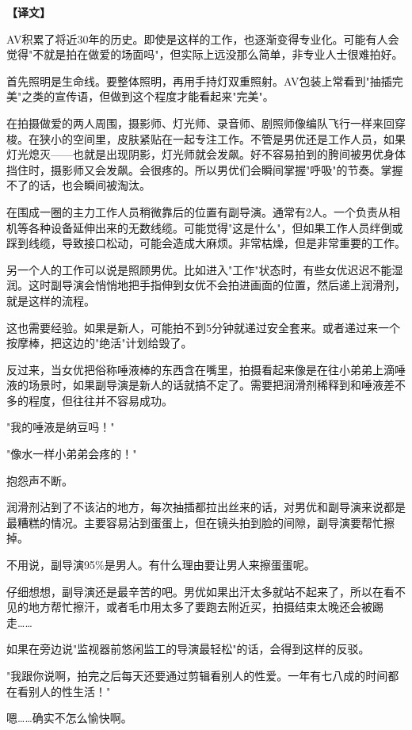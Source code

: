 \documentclass[12pt,UTF8]{ctexbook}
\begin{document}
{\vspace{2ex}
\parbox{0.9\linewidth}{
\textbf{【译文】}\par

AV积累了将近30年的历史。即使是这样的工作，也逐渐变得专业化。可能有人会觉得"不就是拍在做爱的场面吗"，但实际上远没那么简单，非专业人士很难拍好。

首先照明是生命线。要整体照明，再用手持灯双重照射。AV包装上常看到"抽插完美"之类的宣传语，但做到这个程度才能看起来"完美"。

在拍摄做爱的两人周围，摄影师、灯光师、录音师、剧照师像编队飞行一样来回穿梭。在狭小的空间里，皮肤紧贴在一起专注工作。不管是男优还是工作人员，如果灯光熄灭——也就是出现阴影，灯光师就会发飙。好不容易拍到的胯间被男优身体挡住时，摄影师又会发飙。会很疼的。所以男优们会瞬间掌握"呼吸"的节奏。掌握不了的话，也会瞬间被淘汰。

在围成一圈的主力工作人员稍微靠后的位置有副导演。通常有2人。一个负责从相机等各种设备延伸出来的无数线缆。可能觉得"这是什么"，但如果工作人员绊倒或踩到线缆，导致接口松动，可能会造成大麻烦。非常枯燥，但是非常重要的工作。

另一个人的工作可以说是照顾男优。比如进入"工作"状态时，有些女优迟迟不能湿润。这时副导演会悄悄地把手指伸到女优不会拍进画面的位置，然后递上润滑剂，就是这样的流程。

这也需要经验。如果是新人，可能拍不到5分钟就递过安全套来。或者递过来一个按摩棒，把这边的"绝活"计划给毁了。

反过来，当女优把俗称唾液棒的东西含在嘴里，拍摄看起来像是在往小弟弟上滴唾液的场景时，如果副导演是新人的话就搞不定了。需要把润滑剂稀释到和唾液差不多的程度，但往往并不容易成功。

"我的唾液是纳豆吗！"

"像水一样小弟弟会疼的！"

抱怨声不断。

润滑剂沾到了不该沾的地方，每次抽插都拉出丝来的话，对男优和副导演来说都是最糟糕的情况。主要容易沾到蛋蛋上，但在镜头拍到脸的间隙，副导演要帮忙擦掉。

不用说，副导演95\%是男人。有什么理由要让男人来擦蛋蛋呢。

仔细想想，副导演还是最辛苦的吧。男优如果出汗太多就站不起来了，所以在看不见的地方帮忙擦汗，或者毛巾用太多了要跑去附近买，拍摄结束太晚还会被踢走……

如果在旁边说"监视器前悠闲监工的导演最轻松"的话，会得到这样的反驳。

"我跟你说啊，拍完之后每天还要通过剪辑看别人的性爱。一年有七八成的时间都在看别人的性生活！"

嗯……确实不怎么愉快啊。
}

}
\end{document}
